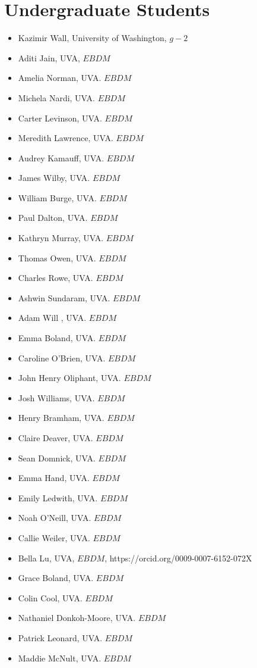 \documentclass[10pt]{article}
\begin{document}
\section*{Undergraduate Students} %
\begin{itemize}
\item Kazimir Wall, University of Washington, $g-2$
\item Aditi Jain, UVA, $EBDM$
\item Amelia Norman, UVA. $EBDM$
\item Michela Nardi, UVA. $EBDM$
\item Carter Levinson, UVA. $EBDM$
\item Meredith Lawrence, UVA. $EBDM$
\item Audrey Kamauff, UVA. $EBDM$
\item James Wilby, UVA. $EBDM$
\item William Burge, UVA. $EBDM$
\item Paul Dalton, UVA. $EBDM$
\item Kathryn Murray, UVA. $EBDM$
\item Thomas Owen, UVA. $EBDM$
\item Charles Rowe, UVA. $EBDM$
\item Ashwin Sundaram, UVA. $EBDM$
\item Adam Will , UVA. $EBDM$
\item Emma Boland, UVA. $EBDM$
\item Caroline O’Brien, UVA. $EBDM$
\item John Henry Oliphant, UVA. $EBDM$
\item Josh Williams, UVA. $EBDM$
\item Henry Bramham, UVA. $EBDM$
\item Claire Deaver, UVA. $EBDM$
\item Sean Domnick, UVA. $EBDM$
\item Emma Hand, UVA. $EBDM$
\item Emily Ledwith, UVA. $EBDM$
\item Noah O’Neill, UVA. $EBDM$
\item Callie Weiler, UVA. $EBDM$
\item Bella Lu, UVA, $EBDM$, https://orcid.org/0009-0007-6152-072X
\item Grace Boland, UVA. $EBDM$
\item Colin Cool, UVA. $EBDM$
\item Nathaniel Donkoh-Moore, UVA. $EBDM$
\item Patrick Leonard, UVA. $EBDM$
\item Maddie McNult, UVA. $EBDM$

\end{itemize}
\end{document}
